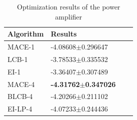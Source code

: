 \begin{table}[!htb]
    \centering
    \caption{Optimization results of the power amplifier}
    \vskip 0.15in
    \label{tab:result_PA}
    \begin{tabular}{llll}
        \toprule
        Algorithm & Results               \\ \midrule
        MACE-1    & -4.08608$\pm$0.296647 \\
        LCB-1     & -3.78533$\pm$0.335532 \\
        EI-1      & -3.36407$\pm$0.307489 \\
        MACE-4    & \textbf{-4.31762$\pm$0.347026} \\
        BLCB-4    & -4.20266$\pm$0.211102 \\
        EI-LP-4   & -4.07233$\pm$0.244436 \\
        \bottomrule
    \end{tabular}
    \vskip -0.1in
\end{table}

